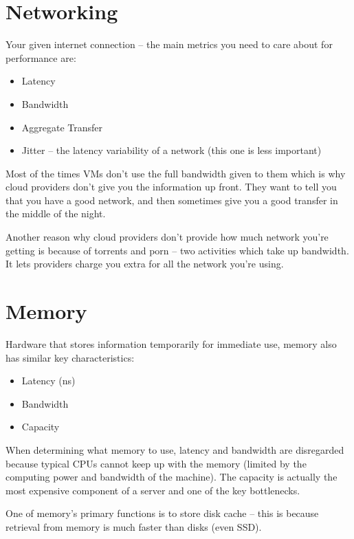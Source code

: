 \documentclass{report}
\newcommand{\npar}{\par\noindent}
\newcommand{\vpar}{\vspace{1em}\npar}
\begin{document}
\section{Networking}

\par Your given internet connection -- the main metrics you need to care about for performance are:

\begin{itemize}
    \item Latency
    \item Bandwidth
    \item Aggregate Transfer
    \item Jitter -- the latency variability of a network (this one is less important)
\end{itemize}

\npar Most of the times VMs don't use the full bandwidth given to them which is why cloud providers don't give you the information up front. They want to tell you that you have a good network, and then sometimes give you a good transfer in the middle of the night.

\vpar Another reason why cloud providers don't provide how much network you're getting is because of torrents and porn -- two activities which take up bandwidth. It lets providers charge you extra for all the network you're using.

\newpage
\section{Memory}

\par Hardware that stores information temporarily for immediate use, memory also has similar key characteristics:

\begin{itemize}
    \item Latency (ns)
    \item Bandwidth
    \item Capacity
\end{itemize}

\npar When determining what memory to use, latency and bandwidth are disregarded because typical CPUs cannot keep up with the memory (limited by the computing power and bandwidth of the machine). The capacity is actually the most expensive component of a server and one of the key bottlenecks.

\vpar One of memory's primary functions is to store disk cache -- this is because retrieval from memory is much faster than disks (even SSD).
\end{document}
